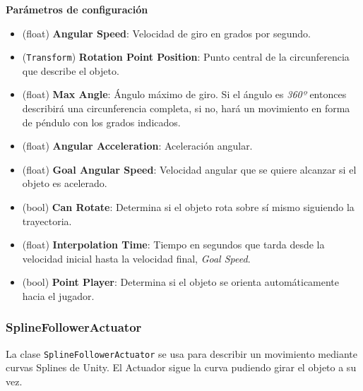 \textbf{Parámetros de configuración}
\begin{itemize}
	\item (float) \textbf{Angular Speed}: Velocidad de giro en grados por segundo.
	\item (\texttt{Transform}) \textbf{Rotation Point Position}: Punto central de la circunferencia que describe el objeto.
	\item (float) \textbf{Max Angle}: Ángulo máximo de giro. Si el ángulo es \textit{360º} entonces describirá una circunferencia completa, si no, hará un movimiento en forma de péndulo con los grados indicados.
	\item (float) \textbf{Angular Acceleration}: Aceleración angular.
	\item (float) \textbf{Goal Angular Speed}: Velocidad angular que se quiere alcanzar si el objeto es acelerado.
	\item (bool) \textbf{Can Rotate}: Determina si el objeto rota sobre sí mismo siguiendo la trayectoria.
	\item (float)\textbf{ Interpolation Time}: Tiempo en segundos que tarda desde la velocidad inicial hasta la velocidad final, \textit{Goal Speed}.
	\item (bool) \textbf{Point Player}: Determina si el objeto se orienta automáticamente hacia el jugador.
\end{itemize}

\subsubsection{SplineFollowerActuator}
La clase \texttt{SplineFollowerActuator} se usa para describir un movimiento mediante curvas Splines de Unity. El Actuador sigue la curva pudiendo girar el objeto a su vez.\\

